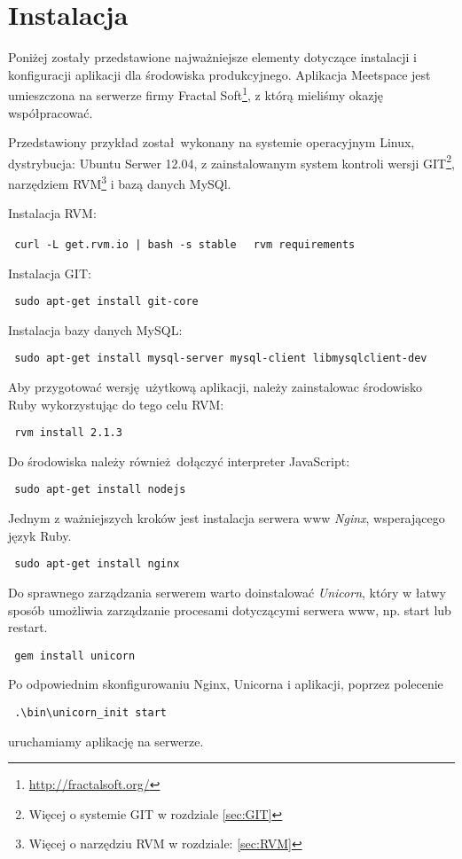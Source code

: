 \section{Instalacja}
Poniżej zostały przedstawione najważniejsze elementy dotyczące instalacji i konfiguracji aplikacji dla środowiska produkcyjnego. Aplikacja Meetspace jest umieszczona na serwerze firmy Fractal Soft\footnote{\url{http://fractalsoft.org/}}, z którą mieliśmy okazję współpracować.

Przedstawiony przykład został wykonany na systemie operacyjnym Linux, dystrybucja: Ubuntu Serwer 12.04, z zainstalowanym system kontroli wersji GIT\footnote{Więcej o systemie GIT w rozdziale \ref{sec:GIT}}, narzędziem RVM\footnote{Więcej o narzędziu RVM w rozdziale: \ref{sec:RVM}} i bazą danych MySQl.

Instalacja RVM:
\begin{center}
  \texttt{ curl -L get.rvm.io | bash -s stable }
  \texttt{ rvm requirements }
\end{center}

Instalacja GIT:
\begin{center}
  \texttt{ sudo apt-get install git-core }
\end{center}

Instalacja bazy danych MySQL:
\begin{center}
  \texttt{ sudo apt-get install mysql-server mysql-client libmysqlclient-dev }
\end{center}

Aby przygotować wersję użytkową aplikacji, należy zainstalowac środowisko Ruby wykorzystując do tego celu RVM:
\begin{center}
  \texttt{ rvm install 2.1.3 }
\end{center}
Do środowiska należy również dołączyć interpreter JavaScript:
\begin{center}
  \texttt{ sudo apt-get install nodejs }
\end{center}

\clearpage
Jednym z ważniejszych kroków jest instalacja serwera www \emph{Nginx}, wsperającego język Ruby.
\begin{center}
  \texttt{ sudo apt-get install nginx }
\end{center}

Do sprawnego zarządzania serwerem warto doinstalować \emph{Unicorn}, który w łatwy sposób umożliwia zarządzanie procesami dotyczącymi serwera www, np. start lub restart.
\begin{center}
  \texttt{ gem install unicorn }
\end{center}

Po odpowiednim skonfigurowaniu Nginx, Unicorna i aplikacji, poprzez polecenie
\begin{center}
  \texttt{ .\textbackslash{bin}\textbackslash{unicorn\_init} start }
\end{center}

uruchamiamy aplikację na serwerze.
